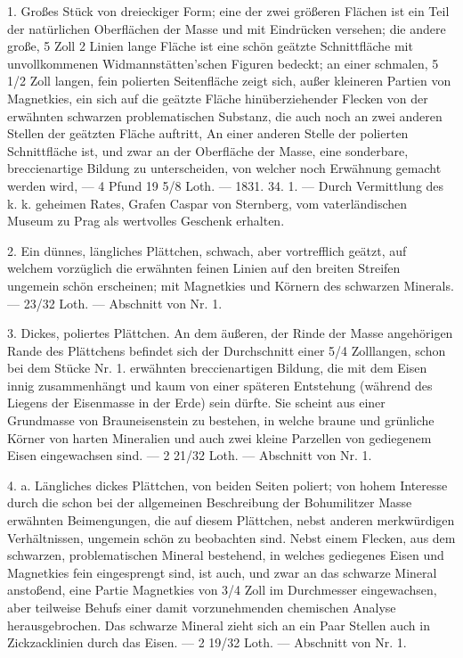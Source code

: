 \documentclass[a4paper, 11pt, oneside, polutonikogreek, german]{article}
\begin{document}
1. Großes Stück von dreieckiger Form; eine der zwei größeren Flächen ist ein Teil der natürlichen Oberflächen der Masse und mit Eindrücken versehen; die andere große, 5 Zoll 2 Linien lange Fläche ist eine schön geätzte Schnittfläche mit unvollkommenen Widmannstätten'schen Figuren bedeckt; an einer schmalen, 5 1/2 Zoll langen, fein polierten Seitenfläche zeigt sich, außer kleineren Partien von Magnetkies, ein sich auf die geätzte Fläche hinüberziehender Flecken von der erwähnten schwarzen problematischen Substanz, die auch noch an zwei anderen Stellen der geätzten Fläche auftritt, An einer anderen Stelle der polierten Schnittfläche ist, und zwar an der Oberfläche der Masse, eine sonderbare, breccienartige Bildung zu unterscheiden, von welcher noch Erwähnung gemacht werden wird, — 4 Pfund 19 5/8 Loth. — 1831. 34. 1. — Durch Vermittlung des k. k. geheimen Rates, Grafen Caspar von Sternberg, vom vaterländischen Museum zu Prag als wertvolles Geschenk erhalten.

2. Ein dünnes, längliches Plättchen, schwach, aber vortrefflich geätzt, auf welchem vorzüglich die erwähnten feinen Linien auf den breiten Streifen ungemein schön erscheinen; mit Magnetkies und Körnern des schwarzen Minerals. — 23/32 Loth. — Abschnitt von Nr. 1.

3. Dickes, poliertes Plättchen. An dem äußeren, der Rinde der Masse angehörigen Rande des Plättchens befindet sich der Durchschnitt einer 5/4 Zolllangen, schon bei dem Stücke Nr. 1. erwähnten breccienartigen Bildung, die mit dem Eisen innig zusammenhängt und kaum von einer späteren Entstehung (während des Liegens der Eisenmasse in der Erde) sein dürfte. Sie scheint aus einer Grundmasse von Brauneisenstein zu bestehen, in welche braune und grünliche Körner von harten Mineralien und auch zwei kleine Parzellen von gediegenem Eisen eingewachsen sind. — 2 21/32 Loth. — Abschnitt von Nr. 1.

4. a. Längliches dickes Plättchen, von beiden Seiten poliert; von hohem Interesse durch die schon bei der allgemeinen Beschreibung der Bohumilitzer Masse erwähnten Beimengungen, die auf diesem Plättchen, nebst anderen merkwürdigen Verhältnissen, ungemein schön zu beobachten sind. Nebst einem Flecken, aus dem schwarzen, problematischen Mineral bestehend, in welches gediegenes Eisen und Magnetkies fein eingesprengt sind, ist auch, und zwar an das schwarze Mineral anstoßend, eine Partie Magnetkies von 3/4 Zoll im Durchmesser eingewachsen, aber teilweise Behufs einer damit vorzunehmenden chemischen Analyse herausgebrochen. Das schwarze Mineral zieht sich an ein Paar Stellen auch in Zickzacklinien durch das Eisen. — 2 19/32 Loth. — Abschnitt von Nr. 1.
\end{document}
